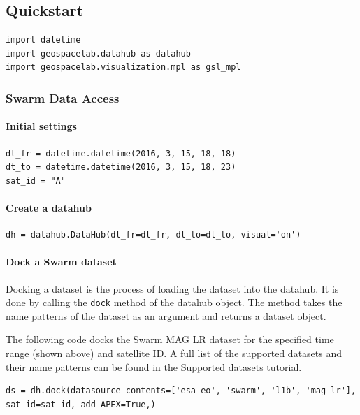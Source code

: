 \subsection{Quickstart}

\begin{verbatim}
import datetime
import geospacelab.datahub as datahub
import geospacelab.visualization.mpl as gsl_mpl
\end{verbatim}

\subsubsection{Swarm Data Access}

\paragraph{Initial settings}

\begin{verbatim}
dt_fr = datetime.datetime(2016, 3, 15, 18, 18)
dt_to = datetime.datetime(2016, 3, 15, 18, 23)
sat_id = "A"
\end{verbatim}

\paragraph{Create a datahub}

\begin{verbatim}
dh = datahub.DataHub(dt_fr=dt_fr, dt_to=dt_to, visual='on')
\end{verbatim}

\paragraph{Dock a Swarm dataset}

Docking a dataset is the process of loading the dataset into the datahub. It is done by calling the \texttt{dock} method of the datahub object. The method takes the name patterns of the dataset as an argument and returns a dataset object.

The following code docks the Swarm MAG LR dataset for the specified time range (shown above) and satellite ID. A full list of the supported datasets and their name patterns can be found in the \href{/supported-datasets}{Supported datasets} tutorial.

\begin{verbatim}
ds = dh.dock(datasource_contents=['esa_eo', 'swarm', 'l1b', 'mag_lr'], sat_id=sat_id, add_APEX=True,)
\end{verbatim}

